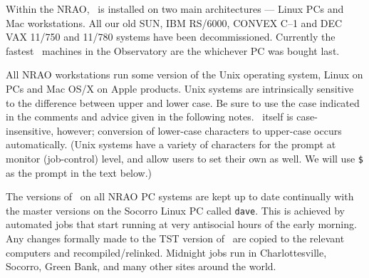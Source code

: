     Within the NRAO, \AIPS\ is installed on two main architectures ---
Linux PCs and Mac workstations.  All our old SUN, IBM RS/6000, CONVEX
C--1 and DEC VAX 11/750 and 11/780 systems have been decommissioned.
Currently the fastest \AIPS\ machines in the Observatory are the
whichever PC was bought last.


     All NRAO workstations run some version of the Unix operating
system, Linux on PCs and Mac OS/X on Apple products.  Unix systems are
intrinsically sensitive to the difference between upper and lower
case.  Be sure to use the case indicated in the comments and advice
given in the following notes.  \AIPS\ itself is case-insensitive,
however; conversion of lower-case characters to upper-case occurs
automatically.  (Unix systems have a variety of characters for the
prompt at monitor (job-control) level, and allow users to set their
own as well.  We will use {\tt \$} as the prompt in the text below.)


    The versions of \AIPS\ on all NRAO PC systems are kept up to date
continually with the master versions on the Socorro Linux PC called
{\tt dave}.  This is achieved by automated jobs that start running at
very antisocial hours of the early morning.  Any changes formally made
to the {\us TST} version of \AIPS\ are copied to the relevant
computers and recompiled/relinked.  Midnight jobs run in
Charlottesville, Socorro, Green Bank, and many other sites around the
world.



